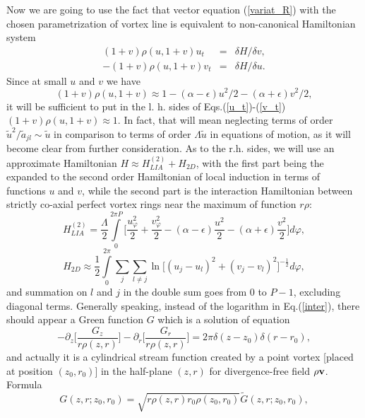 \documentclass[pra,twocolumn,showpacs]{revtex4}
\begin{document}
Now we are going to use the fact that vector equation (\ref{variat_R}) with the chosen parametrization 
of vortex line is equivalent to non-canonical Hamiltonian system
\begin{eqnarray}
 (1+v)\rho(u,1+v) u_t&=&\delta H/\delta v,
 \label{u_t}\\
-(1+v)\rho(u,1+v) v_t&=&\delta H/\delta u.
 \label{v_t}
\end{eqnarray}
Since at small $u$ and $v$ we have
\begin{equation}
(1+v)\rho(u,1+v)\approx 1-(\alpha-\epsilon) u^2/2 -(\alpha+\epsilon) v^2/2,
\end{equation}
it will be sufficient to put in the l. h. sides of Eqs.(\ref{u_t})-(\ref{v_t}) $(1+v)\rho(u,1+v)\approx 1$. 
In fact, that will mean neglecting terms of order $\tilde u^2/\tilde a_{jl}\sim \tilde u$ in comparison
to terms of order $\Lambda \tilde u$ in equations of motion, as it will become clear from further 
consideration. As to the r.h. sides,  we will use an approximate Hamiltonian $H\approx H_{LIA}^{(2)}+H_{2D}$,
with the first part being the expanded to the second order Hamiltonian of local induction in terms of
functions $u$ and $v$, while the second part is the interaction Hamiltonian between strictly co-axial
perfect vortex rings near the maximum of function $r\rho$:
\begin{equation}
H_{LIA}^{(2)}=\frac{\Lambda}{2}\int\limits_0^{2\pi P}\Big[\frac{u_\varphi^2}{2}+\frac{v_\varphi^2}{2}
-(\alpha-\epsilon) \frac{u^2}{2} -(\alpha+\epsilon) \frac{v^2}{2} \Big]d\varphi,
\end{equation}
\begin{equation}
H_{2D}\approx\frac{1}{2}\int\limits_0^{2\pi}\sum_j\sum_{l\neq j}
\ln\Big[(u_j-u_l)^2 +(v_j-v_l)^2\Big]^{-\frac{1}{2}} d\varphi,
\label{inter}
\end{equation}
and summation on $l$ and $j$ in the double sum goes from $0$ to $P-1$, excluding diagonal terms.
Generally speaking, instead of the logarithm in Eq.(\ref{inter}),
there should appear a Green function $G$ which is a solution of equation
\begin{equation}
-\partial_z\Big[\frac{G_z}{r\rho(z,r)}\Big]-\partial_r\Big[\frac{G_r}{r\rho(z,r)}\Big]
=2\pi\delta(z-z_0)\delta(r-r_0),
\end{equation}
and actually it is a cylindrical stream function created by a point vortex [placed at position $(z_0,r_0)$]
in the half-plane  $(z,r)$ for divergence-free field $\rho{\bf v}$. Formula  
$$
G(z,r;z_0,r_0)=\sqrt{r\rho(z,r)r_0\rho(z_0,r_0)}\tilde G(z,r;z_0,r_0),
$$ 
\end{document}
